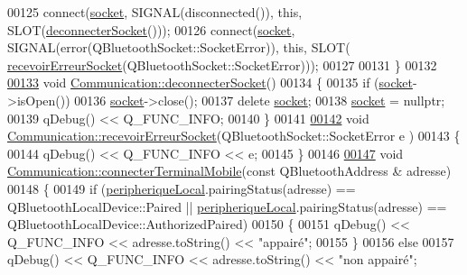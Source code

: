 \begin{DoxyCode}
00125     connect(\hyperlink{class_communication_aa4ddc3151b305db0135d5826384645cc}{socket}, SIGNAL(disconnected()), \textcolor{keyword}{this}, SLOT(\hyperlink{class_communication_a5280c11bea5ead32e7a7101fd5b0f9b2}{deconnecterSocket}()));
00126     connect(\hyperlink{class_communication_aa4ddc3151b305db0135d5826384645cc}{socket}, SIGNAL(error(QBluetoothSocket::SocketError)), \textcolor{keyword}{this}, SLOT(
      \hyperlink{class_communication_a94a9c34e683d590fc6abbc4111a57f29}{recevoirErreurSocket}(QBluetoothSocket::SocketError)));
00127 
00131 \}
00132 
\hyperlink{class_communication_a5280c11bea5ead32e7a7101fd5b0f9b2}{00133} \textcolor{keywordtype}{void} \hyperlink{class_communication_a5280c11bea5ead32e7a7101fd5b0f9b2}{Communication::deconnecterSocket}()
00134 \{    
00135     \textcolor{keywordflow}{if} (\hyperlink{class_communication_aa4ddc3151b305db0135d5826384645cc}{socket}->isOpen())
00136        \hyperlink{class_communication_aa4ddc3151b305db0135d5826384645cc}{socket}->close();
00137     \textcolor{keyword}{delete} \hyperlink{class_communication_aa4ddc3151b305db0135d5826384645cc}{socket};
00138     \hyperlink{class_communication_aa4ddc3151b305db0135d5826384645cc}{socket} = \textcolor{keyword}{nullptr};
00139     qDebug() << Q\_FUNC\_INFO;
00140 \}
00141 
\hyperlink{class_communication_a94a9c34e683d590fc6abbc4111a57f29}{00142} \textcolor{keywordtype}{void} \hyperlink{class_communication_a94a9c34e683d590fc6abbc4111a57f29}{Communication::recevoirErreurSocket}(QBluetoothSocket::SocketError e
      )
00143 \{
00144     qDebug() << Q\_FUNC\_INFO << e;
00145 \}
00146 
\hyperlink{class_communication_a9640339b93f4a99f80426b7345615037}{00147} \textcolor{keywordtype}{void} \hyperlink{class_communication_a9640339b93f4a99f80426b7345615037}{Communication::connecterTerminalMobile}(\textcolor{keyword}{const} QBluetoothAddress &
      adresse)
00148 \{
00149     \textcolor{keywordflow}{if} (\hyperlink{class_communication_a2d643d199169dfe1d258df54d3ee5728}{peripheriqueLocal}.pairingStatus(adresse) == QBluetoothLocalDevice::Paired || 
      \hyperlink{class_communication_a2d643d199169dfe1d258df54d3ee5728}{peripheriqueLocal}.pairingStatus(adresse) == QBluetoothLocalDevice::AuthorizedPaired)
00150     \{
00151         qDebug() << Q\_FUNC\_INFO << adresse.toString() << \textcolor{stringliteral}{"appairé"};
00155     \}
00156     \textcolor{keywordflow}{else}
00157         qDebug() << Q\_FUNC\_INFO << adresse.toString() << \textcolor{stringliteral}{"non appairé"};

\end{DoxyCode}
